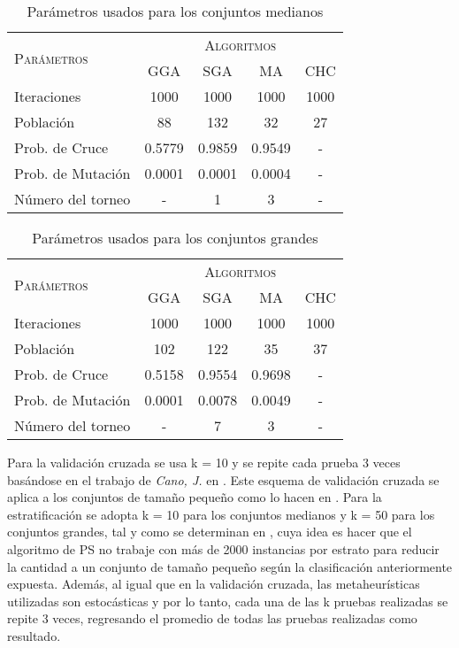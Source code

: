 \begin{table}[]
\centering
\begin{tabular}{l c c c c}
\hline
\multirow{2}{*}{\textsc{Parámetros}}
	& \multicolumn{4}{c}{\textsc{Algoritmos}} \\
	& GGA & SGA & MA & CHC \\
\hline
\hline
Iteraciones             &  1000    &  1000    &  1000      &  1000 \\
Población               &    88    &    132   &    32      &    27 \\
Prob. de Cruce          &   0.5779 &   0.9859 &     0.9549 &     - \\
Prob. de Mutación       &   0.0001 &  0.0001  &     0.0004 &     - \\
Número del torneo       &   -      &    1     &     3      &     - \\
\hline
\end{tabular}
\caption{Parámetros usados para los conjuntos medianos}
\label{param-med}
\end{table}

\begin{table}[]
\centering
\begin{tabular}{l c c c c}
\hline
\multirow{2}{*}{\textsc{Parámetros}}
	& \multicolumn{4}{c}{\textsc{Algoritmos}} \\
	& GGA & SGA & MA & CHC \\
\hline
\hline
Iteraciones             &  1000    &  1000    &  1000      &  1000 \\
Población               &    102   &    122   &    35      &    37 \\
Prob. de Cruce          &   0.5158 &   0.9554 &     0.9698 &     - \\
Prob. de Mutación       &   0.0001 &  0.0078  &     0.0049 &     - \\
Número del torneo       &   -      &    7     &     3      &     - \\
\hline
\end{tabular}
\caption{Parámetros usados para los conjuntos grandes}
\label{param-grande}
\end{table}

Para la validación cruzada se usa k = 10 y se repite cada prueba 3 veces basándose en el trabajo de \emph{Cano, J.} en \cite{de2004reduccion}. Este esquema de validación cruzada se aplica a los conjuntos de tamaño pequeño como lo hacen en \cite{de2004reduccion}. Para la estratificación se adopta k = 10 para los conjuntos medianos y k = 50 para los conjuntos grandes, tal y como se determinan en \cite{cano2005stratification}, cuya idea es hacer que el algoritmo de PS no trabaje con más de 2000 instancias por estrato para reducir la cantidad a un conjunto de tamaño pequeño según la clasificación anteriormente expuesta. Además, al igual que en la validación cruzada, las metaheurísticas utilizadas son estocásticas y por lo tanto, cada una de las k pruebas realizadas se repite 3 veces, regresando el promedio de todas las pruebas realizadas como resultado.


